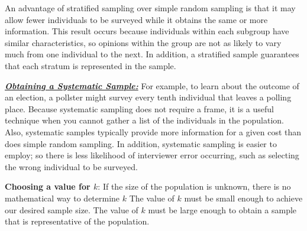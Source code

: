\documentclass{report}
\begin{document}
        \bigbreak \noindent 
        An advantage of stratified sampling over simple random sampling is that it may allow fewer individuals to be surveyed while it obtains the same or more information. This result occurs because individuals within each subgroup have similar characteristics, so opinions within the group are not as likely to vary much from one individual to the next. In addition, a stratified sample guarantees that each stratum is represented in the sample.

        \bigbreak \noindent \bigbreak \noindent 
        \textbf{\textit{\underline{Obtaining a Systematic Sample:}}}
        \bigbreak \noindent 
        For example, to learn about the outcome of an election, a pollster might survey every tenth individual that leaves a polling place.
        \bigbreak \noindent 
        Because systematic sampling does not require a frame, it is a useful technique when you cannot gather a list of the individuals in the population. Also, systematic samples typically provide more information for a given cost than does simple random sampling. In addition, systematic sampling is easier to employ; so there is less likelihood of interviewer error occurring, such as selecting the wrong individual to be surveyed.

        \bigbreak \noindent 
        \textbf{Choosing a value for $k $}:
        \bigbreak \noindent 
        If the size of the population is unknown, there is no mathematical way to determine $k$
        \bigbreak \noindent 
        The value  of $k$ must be small enough to achieve our desired sample size.
        \bigbreak \noindent 
        The value of $k$ must be large enough to obtain a sample that is representative of the population.
\end{document}
